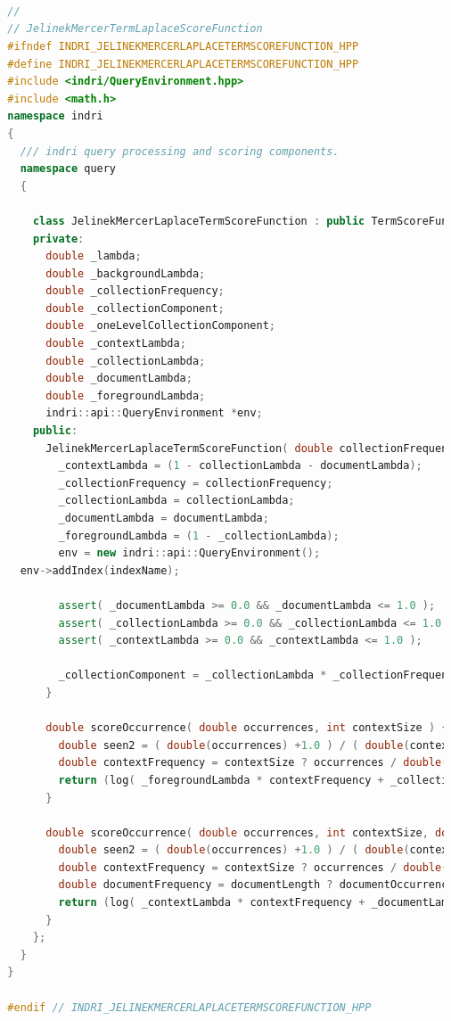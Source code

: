 \documentclass{article}
\begin{document}
\begin{lstlisting}[language=c++,caption={JelinekMercerTermLaplaceScoreFunction.hpp},basicstyle=\tiny]



  //
  // JelinekMercerTermLaplaceScoreFunction
  #ifndef INDRI_JELINEKMERCERLAPLACETERMSCOREFUNCTION_HPP
  #define INDRI_JELINEKMERCERLAPLACETERMSCOREFUNCTION_HPP
  #include <indri/QueryEnvironment.hpp>
  #include <math.h>
  namespace indri
  {
    /// indri query processing and scoring components.
    namespace query
    {
      
      class JelinekMercerLaplaceTermScoreFunction : public TermScoreFunction {
      private:
        double _lambda;
        double _backgroundLambda;
        double _collectionFrequency;
        double _collectionComponent;
        double _oneLevelCollectionComponent;
        double _contextLambda;
        double _collectionLambda;
        double _documentLambda;
        double _foregroundLambda;
        indri::api::QueryEnvironment *env;
      public:
        JelinekMercerLaplaceTermScoreFunction( double collectionFrequency, double collectionLambda, double documentLambda  , const std::string& indexName ) {
          _contextLambda = (1 - collectionLambda - documentLambda);
          _collectionFrequency = collectionFrequency;
          _collectionLambda = collectionLambda;
          _documentLambda = documentLambda;
          _foregroundLambda = (1 - _collectionLambda);
          env = new indri::api::QueryEnvironment(); 
    env->addIndex(indexName);
  
          assert( _documentLambda >= 0.0 && _documentLambda <= 1.0 );
          assert( _collectionLambda >= 0.0 && _collectionLambda <= 1.0 );
          assert( _contextLambda >= 0.0 && _contextLambda <= 1.0 );
      
          _collectionComponent = _collectionLambda * _collectionFrequency;
        }
  
        double scoreOccurrence( double occurrences, int contextSize ) {
          double seen2 = ( double(occurrences) +1.0 ) / ( double(contextSize) + double(env->termCountUnique ()) );
          double contextFrequency = contextSize ? occurrences / double(contextSize) : 0.0;
          return (log( _foregroundLambda * contextFrequency + _collectionComponent )+log(seen2));
        }
  
        double scoreOccurrence( double occurrences, int contextSize, double documentOccurrences, int documentLength ) {
          double seen2 = ( double(occurrences) +1.0 ) / ( double(contextSize) + double(env->termCountUnique ()) );
          double contextFrequency = contextSize ? occurrences / double(contextSize) : 0.0;
          double documentFrequency = documentLength ? documentOccurrences / double(documentLength) : 0.0;
          return (log( _contextLambda * contextFrequency + _documentLambda * documentFrequency + _collectionComponent )+log(seen2));
        }
      };
    }
  }
  
  #endif // INDRI_JELINEKMERCERLAPLACETERMSCOREFUNCTION_HPP
  
  \end{lstlisting}
\end{document}
